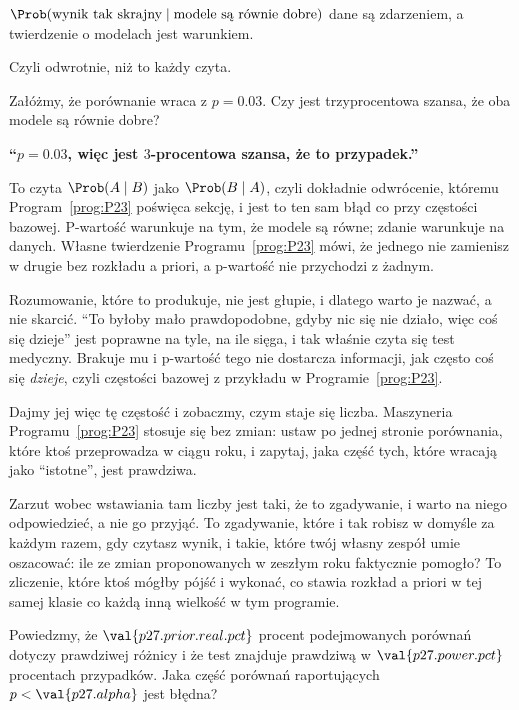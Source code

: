 \begin{fr}
\begin{ansblock}
$\Prob(\text{wynik tak skrajny} \mid \text{modele są równie dobre})$
\dash{} dane są zdarzeniem, a twierdzenie o modelach jest warunkiem.
\end{ansblock}

Czyli odwrotnie, niż to każdy czyta.

Załóżmy, że porównanie wraca z $p = \num{0.03}$. Czy jest trzyprocentowa
szansa, że oba modele są równie dobre?
\dotline
\nextframe
\end{fr}

\begin{fr}

\begin{trapbox}
\textbf{\enquote{$p = \num{0.03}$, więc jest $3$-procentowa szansa, że to
przypadek.}}

To czyta $\Prob(A \mid B)$ jako $\Prob(B \mid A)$, czyli dokładnie
odwrócenie, któremu Program~\ref{prog:P23} poświęca sekcję, i jest to ten sam
błąd co przy częstości bazowej. P-wartość warunkuje na tym, że modele są
równe; zdanie warunkuje na danych. Własne twierdzenie
Programu~\ref{prog:P23} mówi, że jednego nie zamienisz w drugie bez rozkładu a
priori, a p-wartość nie przychodzi z żadnym.

Rozumowanie, które to produkuje, nie jest głupie, i dlatego warto je nazwać, a
nie skarcić. \enquote{To byłoby mało prawdopodobne, gdyby nic się nie działo,
więc coś się dzieje} jest poprawne na tyle, na ile sięga, i tak właśnie czyta
się test medyczny. Brakuje mu \dash{} i p-wartość tego nie dostarcza \dash{}
informacji, jak często coś się \emph{dzieje}, czyli częstości bazowej z
przykładu w Programie~\ref{prog:P23}.
\end{trapbox}
\end{fr}

\begin{fr}
Dajmy jej więc tę częstość i zobaczmy, czym staje się liczba. Maszyneria
Programu~\ref{prog:P23} stosuje się bez zmian: ustaw po jednej stronie
porównania, które ktoś przeprowadza w ciągu roku, i zapytaj, jaka część tych,
które wracają jako \enquote{istotne}, jest prawdziwa.

Zarzut wobec wstawiania tam liczby jest taki, że to zgadywanie, i warto na
niego odpowiedzieć, a nie go przyjąć. To zgadywanie, które i tak robisz w
domyśle za każdym razem, gdy czytasz wynik, i takie, które twój własny zespół
umie oszacować: ile ze zmian proponowanych w zeszłym roku faktycznie pomogło?
To zliczenie, które ktoś mógłby pójść i wykonać, co stawia rozkład a priori w
tej samej klasie co każdą inną wielkość w tym programie.

Powiedzmy, że $\val{p27.prior.real.pct}$ procent podejmowanych porównań
dotyczy prawdziwej różnicy i że test znajduje prawdziwą w
$\val{p27.power.pct}$ procentach przypadków. Jaka część porównań
raportujących $p < \val{p27.alpha}$ jest błędna?
\dotline
\nextframe
\end{fr}

